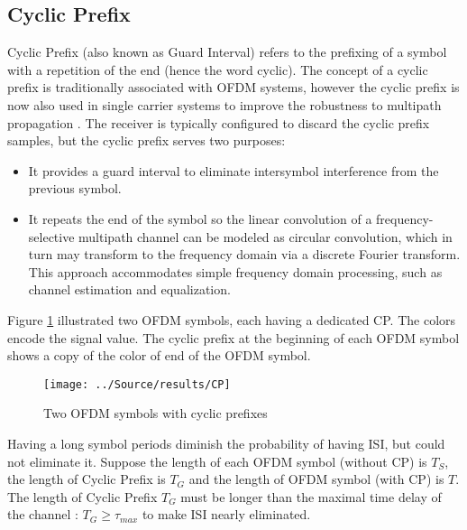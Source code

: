 \subsection{Cyclic Prefix}
Cyclic Prefix (also known as Guard Interval) refers to the prefixing of a symbol with a repetition of the end (hence the word cyclic). The concept of a cyclic prefix is traditionally associated with OFDM systems, however the cyclic prefix is now also used in single carrier systems to improve the robustness to multipath propagation \cite{CP}. The receiver is typically configured to discard the cyclic prefix samples, but the cyclic prefix serves two purposes:
\begin{itemize}
    \item It provides a guard interval to eliminate intersymbol interference from the previous symbol.
    \item It repeats the end of the symbol so the linear convolution of a frequency-selective multipath channel can be modeled as circular convolution, which in turn may transform to the frequency domain via a discrete Fourier transform. This approach accommodates simple frequency domain processing, such as channel estimation and equalization.
\end{itemize}
Figure \ref{fig:cp} \cite{CP2} illustrated two OFDM symbols, each having a dedicated CP. The colors encode the signal value. The cyclic prefix at the beginning of each OFDM symbol shows a copy of the color of end of the OFDM symbol.

\begin{figure}[htbp]
    \centering
    \texttt{[image: ../Source/results/CP]}
    \caption{Two OFDM symbols with cyclic prefixes}
    \label{fig:cp}
\end{figure}

Having a long symbol periods diminish the probability of having ISI, but could not eliminate it. Suppose the length of each OFDM symbol (without CP) is $T_S$, the length of Cyclic Prefix is $T_G$ and the length of OFDM symbol (with CP) is $T$. The length of Cyclic Prefix $T_G$ must be longer than the maximal time delay of the channel : $T_G \geq \tau_{max}$ to make ISI nearly eliminated.

